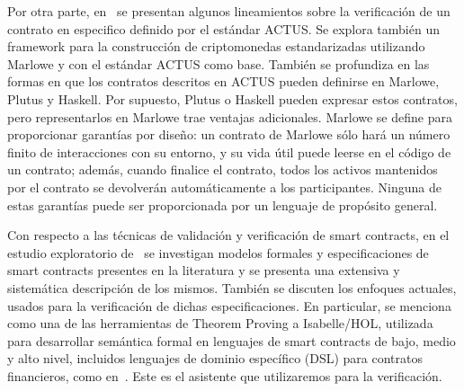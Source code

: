 \documentclass[12pt]{book}
\begin{document}
Por otra parte, en~\cite{kondratiukstandardized} se presentan algunos lineamientos sobre la verificación de un contrato en especifico definido por el estándar ACTUS. Se explora también un framework para la construcción de criptomonedas estandarizadas utilizando Marlowe y con el estándar ACTUS como base. También se profundiza en las formas en que los contratos descritos en ACTUS pueden definirse en Marlowe, Plutus y Haskell. Por supuesto, Plutus o Haskell pueden expresar estos contratos, pero representarlos en Marlowe trae ventajas adicionales. Marlowe se define para proporcionar garantías por diseño: un contrato de Marlowe sólo hará un número finito de interacciones con su entorno, y su vida útil puede leerse en el código de un contrato; además, cuando finalice el contrato, todos los activos mantenidos por el contrato se devolverán automáticamente a los participantes. Ninguna de estas garantías puede ser proporcionada por un lenguaje de propósito general.

Con respecto a las técnicas de validación y verificación de smart contracts, en el estudio exploratorio de~\cite{10.1145/3464421}  se investigan modelos formales y especificaciones de smart contracts presentes en la literatura y se presenta una extensiva y sistemática descripción de los mismos. También se discuten los enfoques actuales, usados para la verificación de dichas especificaciones. En particular, se menciona como una de las herramientas de Theorem Proving a Isabelle/HOL, utilizada para desarrollar semántica formal en lenguajes de smart contracts de bajo, medio y alto nivel, incluidos lenguajes de dominio específico (DSL) para contratos financieros, como en~\cite{10.1007/978-3-030-54455-3_35}. Este es el asistente que utilizaremos para la verificación.


\end{document}

